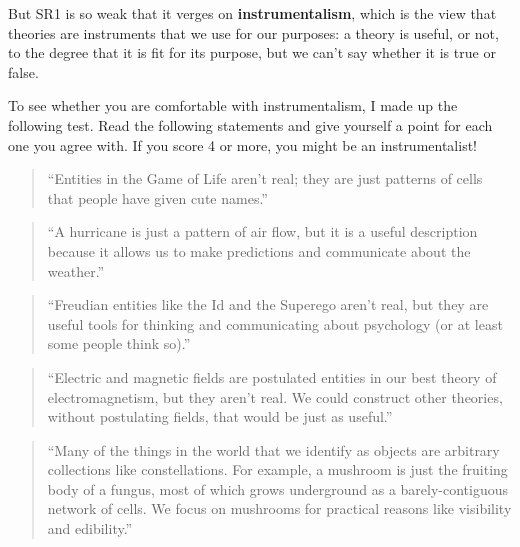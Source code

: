 \documentclass[12pt]{book}
\theoremstyle{exercise}
\begin{document}
But SR1 is so weak that it verges on {\bf instrumentalism}, which is
the view that theories are instruments that we use for our purposes: a theory is useful, or not, to the degree that it is fit for its purpose, but we can't say whether it is true or false.


To see whether you are comfortable with instrumentalism, I made up the following test.  Read the following statements and give yourself a point for each one you agree with.  If you score 4 or more, you might be an instrumentalist!


\begin{quote}
``Entities in the Game of Life aren't real; they are just patterns of
  cells that people have given cute names.''
\end{quote}

\begin{quote}
``A hurricane is just a pattern of air flow, but it is a useful
  description because it allows us to make predictions and communicate
  about the weather.''
\end{quote}


\begin{quote}
``Freudian entities like the Id and the Superego aren't real, but they
  are useful tools for thinking and communicating about psychology (or
  at least some people think so).''
\end{quote}


\begin{quote}
``Electric and magnetic fields are postulated entities in our best
  theory of electromagnetism, but they aren't real.  We could
  construct other theories, without postulating fields, that would be
  just as useful.''
\end{quote}


\begin{quote}
``Many of the things in the world that we identify as objects are
  arbitrary collections like constellations.  For example, a mushroom
  is just the fruiting body of a fungus, most of which grows
  underground as a barely-contiguous network of cells.  We focus
  on mushrooms for practical reasons like visibility and edibility.''
\end{quote}

\end{document}
